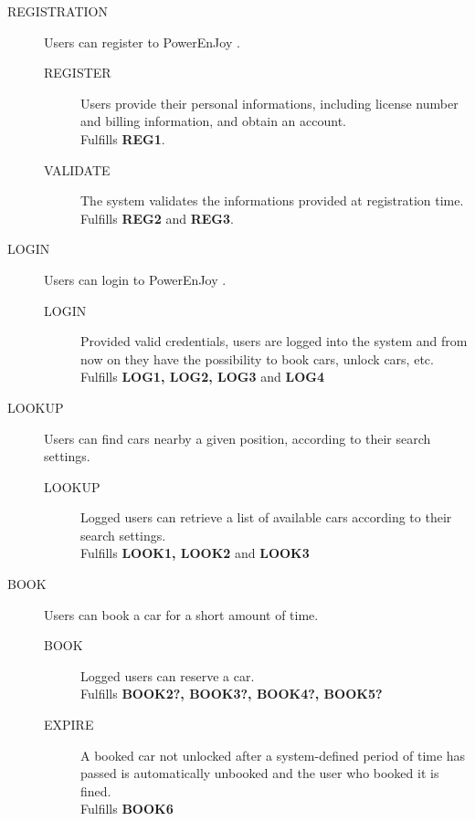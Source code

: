 \documentclass[11pt]{article} %
\newcommand{\pe}{PowerEnJoy }
\begin{document}
\begin{description}
	\item[REGISTRATION] Users can register to \pe.\hfill  {\color{red}{missing REG4, REG5}}
		\begin{description}
			\item[REGISTER] Users provide their personal informations, including license number and billing information, and obtain an account. \\ Fulfills \textbf{REG1}.
			\item[VALIDATE] The system validates the informations provided at registration time. \\ Fulfills \textbf{REG2} and \textbf{REG3}.
		\end{description}

	\item[LOGIN] Users can login to \pe.\hfill {\color{red}{double-check LOG4}}
		\begin{description}
			\item[LOGIN] Provided valid credentials, users are logged into the system and from now on they have the possibility to book cars, unlock cars, etc. \\ Fulfills \textbf{LOG1, LOG2, LOG3} and \textbf{LOG4}
		\end{description}

	\item[LOOKUP] Users can find cars nearby a given position, according to their search settings. \hfill  {\color{red}{missing LOOK4, LOOK5, LOOK6}}
		\begin{description}
			\item[LOOKUP] Logged users can retrieve a list of available cars according to their search settings.\\ Fulfills \textbf{LOOK1, LOOK2} and \textbf{LOOK3} 
		\end{description}

	\item[BOOK] Users can book a car for a short amount of time.\hfill {\color{red}{double-check. Missing BOOK1. EXPIRE added}}
		\begin{description}
			\item[BOOK] Logged users can reserve a car. \\ Fulfills \textbf{BOOK2?, BOOK3?, BOOK4?, BOOK5? }
			\item[EXPIRE] A booked car not unlocked after a system-defined period of time has passed is automatically unbooked and the user who booked it is fined. \\ Fulfills \textbf{BOOK6}
		\end{description}


\end{description}
\end{document}

